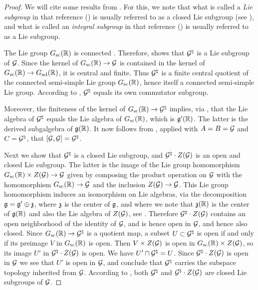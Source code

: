 \documentclass{article}
\theoremstyle{definition}
\numberwithin{equation}{section}
\renewcommand{\-}{\hyp{}}
\begin{document}
\begin{proof}
	We will cite some results from \cite{BourLie1-3}. For this, we note that what is called a \emph{Lie subgroup} in that reference (\cite[Chapter III, \S1, no. 3, Definition 3]{BourLie1-3}) is usually referred to as a closed Lie subgroup (see \cite[Chapter III, \S1, no. 3, Proposition 5]{BourLie1-3}), and what is called an \emph{integral subgroup} in that reference (\cite[Chapter III, \S6, no. 2, Definition 1]{BourLie1-3}) is usually referred to as a Lie subgroup.

	The Lie group $G_{\textrm{sc}}(\mathbb{R})$ is connected \cite[\S7.2, Proposition 7.6]{PR94}. Therefore, \cite[Chapter III, \S3, no. 2, Corollary 1]{BourLie1-3} shows that $\mathcal{G}^\natural$ is a Lie subgroup of $\mathcal{G}$. Since the kernel of $G_{\textrm{sc}}(\mathbb{R}) \to \mathcal{G}$ is contained in the kernel of $G_{\textrm{sc}}(\mathbb{R}) \to G_{\textrm{ad}}(\mathbb{R})$, it is central and finite. Thus $\mathcal{G}^\natural$ is a finite central quotient of the connected semi-simple Lie group $G_{\textrm{sc}}(\mathbb{R})$, hence itself a connected semi-simple Lie group. According to \cite[Chapter III, \S9, no. 8, Proposition 29]{BourLie1-3}, $\mathcal{G}^\natural$ equals its own commutator subgroup.
	
	Moreover, the finiteness of the kernel of $G_{\textrm{sc}}(\mathbb{R}) \to \mathcal{G}^\natural$ implies, via \cite[Chapter III, \S3, no. 2, Corollary 1]{BourLie1-3}, that the Lie algebra of $\mathcal{G}^\natural$ equals the Lie algebra of $G_{\textrm{sc}}(\mathbb{R})$, which is $\mathfrak{g}'(\mathbb{R})$. The latter is the derived subgalgebra of $\mathfrak{g}(\mathbb{R})$. It now follows from \cite[Chapter III, \S9, no. 2, Proposition 4]{BourLie1-3}, applied with $A=B=\mathcal{G}$ and $C=\mathcal{G}^\natural$, that $[\mathcal{G},\mathcal{G}]=\mathcal{G}^\natural$.

	Next we show that $\mathcal{G}^\natural$ is a closed Lie subgroup, and $\mathcal{G}^\natural \cdot Z(\mathcal{G})$ is an open and closed Lie subgroup. The latter is the image of the Lie group homomorphism $G_{\textrm{sc}}(\mathbb{R}) \times Z(\mathcal{G}) \to \mathcal{G}$ given by composing the product operation on $\mathcal{G}$ with the homomorphism $G_{\textrm{sc}}(\mathbb{R}) \to \mathcal{G}$ and the inclusion $Z(\mathcal{G}) \to \mathcal{G}$. This Lie group homomorphism induces an isomorphism on Lie algebras, via the decomposition $\mathfrak{g}=\mathfrak{g}' \oplus \mathfrak{z}$, where $\mathfrak{z}$ is the center of $\mathfrak{g}$, and where we note that $\mathfrak{z}(\mathbb{R})$ is the center of $\mathfrak{g}(\mathbb{R})$ and also the Lie algebra of $Z(\mathcal{G})$, see \cite[Chapter III, \S9, no. 3, Proposition 9]{BourLie1-3}. Therefore $\mathcal{G}^\natural \cdot Z(\mathcal{G})$ contains an open neighborhood of the identity of $\mathcal{G}$, and is hence open in $\mathcal{G}$, and hence also closed. Since $G_{\textrm{sc}}(\mathbb{R}) \to \mathcal{G}^\natural$ is a quotient map, a subset $U \subset \mathcal{G}^\natural$ is open if and only if its preimage $V$ in $G_{\textrm{sc}}(\mathbb{R})$ is open. Then $V \times Z(\mathcal{G})$ is open in $G_{\textrm{sc}}(\mathbb{R}) \times Z(\mathcal{G})$, so its image $U'$ in $\mathcal{G}^\natural \cdot Z(\mathcal{G})$ is open. We have $U' \cap \mathcal{G}^\natural = U$. Since $\mathcal{G}^\natural \cdot Z(\mathcal{G})$ is open in $\mathcal{G}$ we see that $U'$ is open in $\mathcal{G}$, and conclude that $\mathcal{G}^\natural$ carries the subspace topology inherited from $\mathcal{G}$. According to \cite[Chapter III, \S6, no. 2, Proposition 2]{BourLie1-3}, both $\mathcal{G}^\natural$ and $\mathcal{G}^\natural \cdot Z(\mathcal{G})$ are closed Lie subgroups of $\mathcal{G}$.


\end{proof}
\end{document}
